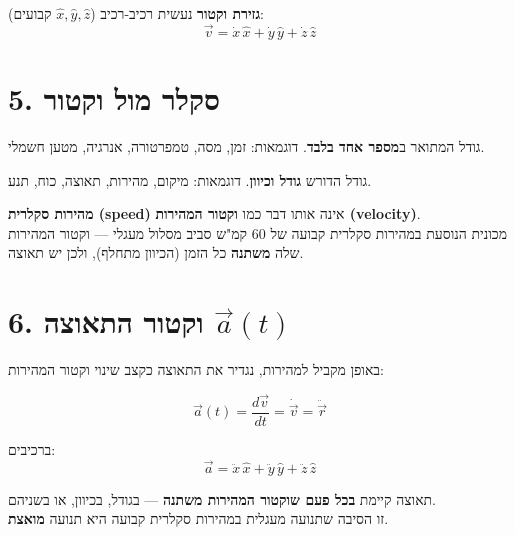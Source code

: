 \documentclass[12pt, a4paper]{article}
\newcommand{\hvec}[1]{\overrightarrow{#1}}
\begin{document}
\textbf{גזירת וקטור} נעשית רכיב-רכיב (\textenglish{$\hat{x}, \hat{y}, \hat{z}$} קבועים):
\[
  \hvec{v} = \dot{x}\,\hat{x} + \dot{y}\,\hat{y} + \dot{z}\,\hat{z}
\]

\section*{5. סקלר מול וקטור}

\begin{tcolorbox}[notebox, title={סקלר}]
גודל המתואר ב\textbf{מספר אחד בלבד}. דוגמאות: זמן, מסה, טמפרטורה, אנרגיה, מטען חשמלי.
\end{tcolorbox}

\begin{tcolorbox}[notebox, title={וקטור}]
גודל הדורש \textbf{גודל וכיוון}. דוגמאות: מיקום, מהירות, תאוצה, כוח, תנע.
\end{tcolorbox}

\begin{tcolorbox}[warnbox, title={שים לב --- בלבול נפוץ}]
\textbf{מהירות סקלרית (\textenglish{speed})} אינה אותו דבר כמו \textbf{וקטור המהירות (\textenglish{velocity})}.\\[3pt]
מכונית הנוסעת במהירות סקלרית קבועה של 60 קמ"ש סביב מסלול מעגלי --- וקטור המהירות שלה \textbf{משתנה} כל הזמן (הכיוון מתחלף), ולכן יש תאוצה.
\end{tcolorbox}

\section*{6. וקטור התאוצה \textenglish{$\hvec{a}(t)$}}

באופן מקביל למהירות, נגדיר את התאוצה כקצב שינוי וקטור המהירות:

\begin{tcolorbox}[resultbox]
\[
  \hvec{a}(t) = \frac{d\hvec{v}}{dt} = \dot{\hvec{v}} = \ddot{\hvec{r}}
\]
\end{tcolorbox}

ברכיבים:
\[
  \hvec{a} = \ddot{x}\,\hat{x} + \ddot{y}\,\hat{y} + \ddot{z}\,\hat{z}
\]

\begin{tcolorbox}[warnbox, title={מתי יש תאוצה?}]
תאוצה קיימת \textbf{בכל פעם שוקטור המהירות משתנה} --- בגודל, בכיוון, או בשניהם.\\
זו הסיבה שתנועה מעגלית במהירות סקלרית קבועה היא תנועה \textbf{מואצת}.
\end{tcolorbox}
\end{document}
